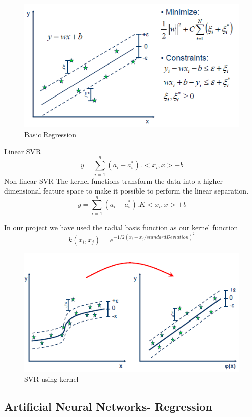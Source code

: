 \documentclass{report}
\begin{document}
\begin{figure}[H]
 \includegraphics[width=\linewidth]{svr.png}
 \caption{Basic Regression}
\end{figure}
Linear SVR		
$$ y = \sum_{i=1}^{n} (a_{i} - a_{i}^*).<x_{i},x> + b $$
Non-linear SVR		
The kernel functions transform the data into a higher dimensional feature space to make it possible to perform the linear separation.		
$$ y = \sum_{i=1}^{n} (a_{i} - a_{i}^*).K<x_{i},x> + b $$

In our project we have used the radial basis function as our kernel function
$$ k(x_{i},x_{j})= e^{-1/2(x_{i}-x_{j}/standardDeviation)^2}$$

\begin{figure}[H]
 \includegraphics[width=\linewidth]{svr2.png}
 \caption{SVR using kernel}
\end{figure}



\newpage

\subsection{Artificial Neural Networks- Regression}
\end{document}
